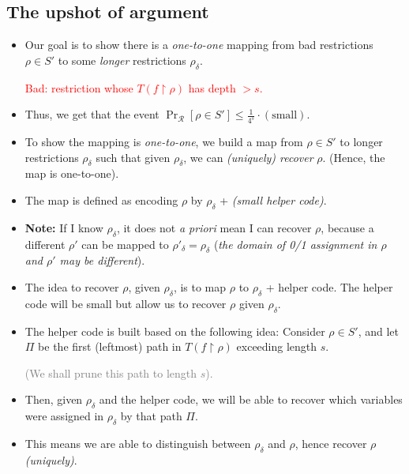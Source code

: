 \subsection*{The upshot of argument}
\begin{itemize}
    \item Our goal is to show there is a \emph{one-to-one} mapping from bad restrictions \( \rho \in S' \) to some \emph{longer} restrictions \( \rho_\delta \). 

    \textcolor{red}{Bad: restriction whose \( T(f\restriction \rho) \) has depth \( > s \).}

    \item Thus, we get that the event \( \Pr_{\mathcal{R}}[ \rho \in S' ] \leq \frac{1}{4^s} \cdot (\text{small}) \).
    
    \item To show the mapping is \emph{one-to-one}, we build a map from \( \rho \in S' \) to longer restrictions \( \rho_\delta \) such that given \( \rho_\delta \), we can \emph{(uniquely) recover} \( \rho \). (Hence, the map is one-to-one).
    
    \item The map is defined as encoding \( \rho \) by \( \rho_\delta \) + \emph{(small helper code)}.

    \item \textbf{Note:} If I know \( \rho_\delta \), it does not \emph{a priori} mean I can recover \( \rho \), because a different \( \rho' \) can be mapped to \( \rho'_\delta = \rho_\delta \) (\emph{the domain of 0/1 assignment in \( \rho \) and \( \rho' \) may be different}).
    
    \item The idea to recover \( \rho \), given \( \rho_\delta \), is to map \( \rho \) to \( \rho_\delta \) + helper code. The helper code will be small but allow us to recover \( \rho \) given \( \rho_\delta \).

    \item The helper code is built based on the following idea: Consider \( \rho \in S' \), and let \( \Pi \) be the first (leftmost) path in \( T(f \restriction \rho) \) exceeding length \( s \). 
    
    \textcolor{gray}{(We shall prune this path to length \( s \)).}
\end{itemize}

\begin{itemize}
    \item Then, given \( \rho_\delta \) and the helper code, we will be able to recover which variables were assigned in \( \rho_\delta \) by that path \( \Pi \).
    
    \item This means we are able to distinguish between \( \rho_\delta \) and \( \rho \), hence recover \( \rho \) \emph{(uniquely)}.
\end{itemize}

